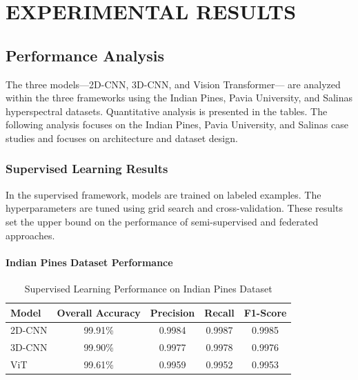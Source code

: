 \chapter{EXPERIMENTAL RESULTS}

\section{Performance Analysis}
The three models—2D-CNN, 3D-CNN, and Vision Transformer— are analyzed within the three frameworks using the Indian Pines, Pavia University, and Salinas hyperspectral datasets. Quantitative analysis is presented in the tables. The following analysis focuses on the Indian Pines, Pavia University, and Salinas case studies and focuses on architecture and dataset design.

\subsection{Supervised Learning Results}
In the supervised framework, models are trained on labeled examples. The hyperparameters are tuned using grid search and cross-validation. These results set the upper bound on the performance of semi-supervised and federated approaches.

\subsubsection{Indian Pines Dataset Performance}
\begin{table}[H]
    \centering
    \caption{Supervised Learning Performance on Indian Pines Dataset}
    \label{tab:supervised_indian}
    \renewcommand{\arraystretch}{1.2}
    \begin{tabular}{|l|c|c|c|c|}
        \hline
        \textbf{Model} & \textbf{Overall Accuracy} & \textbf{Precision} & \textbf{Recall} & \textbf{F1-Score} \\ \hline
        2D-CNN & 99.91\% & 0.9984 & 0.9987 & 0.9985 \\ \hline
        3D-CNN & 99.90\% & 0.9977 & 0.9978 & 0.9976 \\ \hline
        ViT & 99.61\% & 0.9959 & 0.9952 & 0.9953 \\ \hline
    \end{tabular}
\end{table}

